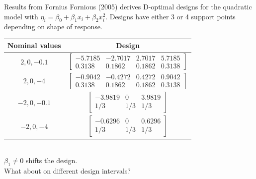 \documentclass[11pt]{beamer}
\begin{document}
\begin{frame}{Results from Fornius}
Fornious (2005) derives D-optimal designs for the quadratic model with $\eta_i = \beta_0 + \beta_1 x_i + \beta_2 x_i^2$. Designs have either 3 or 4 support points depending on shape of response.

\begin{tabular}{|c|c|}
\hline 
 Nominal values & Design \\ 
\hline 
 $2,0,-0.1$ & 
$\begin{bmatrix}
-5.7185 & -2.7017  & 2.7017 & 5.7185\\
0.3138 & 0.1862 & 0.1862 & 0.3138
\end{bmatrix}$  \\ 
\hline 
 $2,0,-4$ & $\begin{bmatrix}
-0.9042 & -0.4272  & 0.4272 & 0.9042\\
0.3138 & 0.1862 & 0.1862 & 0.3138
\end{bmatrix}$   \\ 
\hline 
 $-2,0,-0.1$ & 
$\begin{bmatrix}
-3.9819 & 0  & 3.9819\\
1/3 & 1/3 & 1/3
\end{bmatrix}$   \\ 
\hline 
 $-2,0,-4$ & 
$\begin{bmatrix}
-0.6296 & 0  & 0.6296\\
1/3 & 1/3 & 1/3
\end{bmatrix}$  \\ 
\hline 
\end{tabular} \\
$\beta_1 \neq 0$ shifts the design.\\ What about on different design intervals?
\end{frame}
\end{document}
